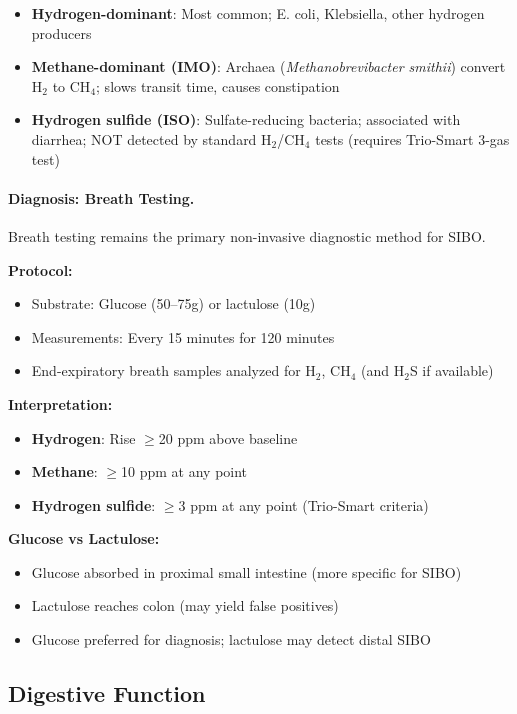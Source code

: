 \begin{itemize}
    \item \textbf{Hydrogen-dominant}: Most common; E. coli, Klebsiella, other hydrogen producers
    \item \textbf{Methane-dominant (IMO)}: Archaea (\textit{Methanobrevibacter smithii}) convert H$_2$ to CH$_4$; slows transit time, causes constipation
    \item \textbf{Hydrogen sulfide (ISO)}: Sulfate-reducing bacteria; associated with diarrhea; NOT detected by standard H$_2$/CH$_4$ tests (requires Trio-Smart 3-gas test)
\end{itemize}

\paragraph{Diagnosis: Breath Testing.}

Breath testing remains the primary non-invasive diagnostic method for SIBO.

\textbf{Protocol:}
\begin{itemize}
    \item Substrate: Glucose (50--75g) or lactulose (10g)
    \item Measurements: Every 15 minutes for 120 minutes
    \item End-expiratory breath samples analyzed for H$_2$, CH$_4$ (and H$_2$S if available)
\end{itemize}

\textbf{Interpretation:}
\begin{itemize}
    \item \textbf{Hydrogen}: Rise $\geq$20 ppm above baseline
    \item \textbf{Methane}: $\geq$10 ppm at any point
    \item \textbf{Hydrogen sulfide}: $\geq$3 ppm at any point (Trio-Smart criteria)
\end{itemize}

\textbf{Glucose vs Lactulose:}
\begin{itemize}
    \item Glucose absorbed in proximal small intestine (more specific for SIBO)
    \item Lactulose reaches colon (may yield false positives)
    \item Glucose preferred for diagnosis; lactulose may detect distal SIBO
\end{itemize}

\subsection{Digestive Function}

